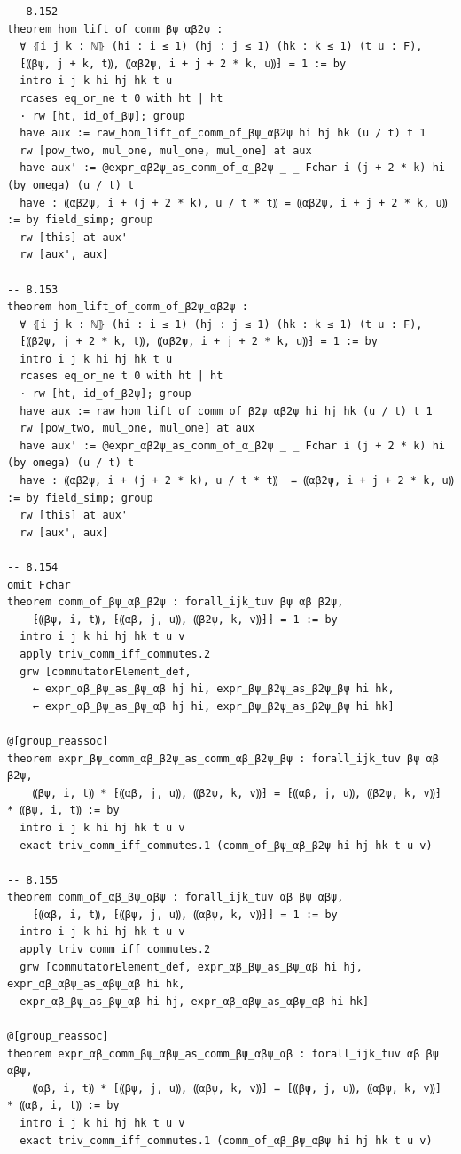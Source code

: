 \begin{Verbatim}
-- 8.152
theorem hom_lift_of_comm_βψ_αβ2ψ :
  ∀ ⦃i j k : ℕ⦄ (hi : i ≤ 1) (hj : j ≤ 1) (hk : k ≤ 1) (t u : F),
  ⁅⸨βψ, j + k, t⸩, ⸨αβ2ψ, i + j + 2 * k, u⸩⁆ = 1 := by
  intro i j k hi hj hk t u
  rcases eq_or_ne t 0 with ht | ht
  · rw [ht, id_of_βψ]; group
  have aux := raw_hom_lift_of_comm_of_βψ_αβ2ψ hi hj hk (u / t) t 1
  rw [pow_two, mul_one, mul_one, mul_one] at aux
  have aux' := @expr_αβ2ψ_as_comm_of_α_β2ψ _ _ Fchar i (j + 2 * k) hi (by omega) (u / t) t
  have : ⸨αβ2ψ, i + (j + 2 * k), u / t * t⸩ = ⸨αβ2ψ, i + j + 2 * k, u⸩ := by field_simp; group
  rw [this] at aux'
  rw [aux', aux]

-- 8.153
theorem hom_lift_of_comm_of_β2ψ_αβ2ψ :
  ∀ ⦃i j k : ℕ⦄ (hi : i ≤ 1) (hj : j ≤ 1) (hk : k ≤ 1) (t u : F),
  ⁅⸨β2ψ, j + 2 * k, t⸩, ⸨αβ2ψ, i + j + 2 * k, u⸩⁆ = 1 := by
  intro i j k hi hj hk t u
  rcases eq_or_ne t 0 with ht | ht
  · rw [ht, id_of_β2ψ]; group
  have aux := raw_hom_lift_of_comm_of_β2ψ_αβ2ψ hi hj hk (u / t) t 1
  rw [pow_two, mul_one, mul_one] at aux
  have aux' := @expr_αβ2ψ_as_comm_of_α_β2ψ _ _ Fchar i (j + 2 * k) hi (by omega) (u / t) t
  have : ⸨αβ2ψ, i + (j + 2 * k), u / t * t⸩  = ⸨αβ2ψ, i + j + 2 * k, u⸩ := by field_simp; group
  rw [this] at aux'
  rw [aux', aux]

-- 8.154
omit Fchar
theorem comm_of_βψ_αβ_β2ψ : forall_ijk_tuv βψ αβ β2ψ,
    ⁅⸨βψ, i, t⸩, ⁅⸨αβ, j, u⸩, ⸨β2ψ, k, v⸩⁆⁆ = 1 := by
  intro i j k hi hj hk t u v
  apply triv_comm_iff_commutes.2
  grw [commutatorElement_def,
    ← expr_αβ_βψ_as_βψ_αβ hj hi, expr_βψ_β2ψ_as_β2ψ_βψ hi hk,
    ← expr_αβ_βψ_as_βψ_αβ hj hi, expr_βψ_β2ψ_as_β2ψ_βψ hi hk]

@[group_reassoc]
theorem expr_βψ_comm_αβ_β2ψ_as_comm_αβ_β2ψ_βψ : forall_ijk_tuv βψ αβ β2ψ,
    ⸨βψ, i, t⸩ * ⁅⸨αβ, j, u⸩, ⸨β2ψ, k, v⸩⁆ = ⁅⸨αβ, j, u⸩, ⸨β2ψ, k, v⸩⁆ * ⸨βψ, i, t⸩ := by
  intro i j k hi hj hk t u v
  exact triv_comm_iff_commutes.1 (comm_of_βψ_αβ_β2ψ hi hj hk t u v)

-- 8.155
theorem comm_of_αβ_βψ_αβψ : forall_ijk_tuv αβ βψ αβψ,
    ⁅⸨αβ, i, t⸩, ⁅⸨βψ, j, u⸩, ⸨αβψ, k, v⸩⁆⁆ = 1 := by
  intro i j k hi hj hk t u v
  apply triv_comm_iff_commutes.2
  grw [commutatorElement_def, expr_αβ_βψ_as_βψ_αβ hi hj, expr_αβ_αβψ_as_αβψ_αβ hi hk,
  expr_αβ_βψ_as_βψ_αβ hi hj, expr_αβ_αβψ_as_αβψ_αβ hi hk]

@[group_reassoc]
theorem expr_αβ_comm_βψ_αβψ_as_comm_βψ_αβψ_αβ : forall_ijk_tuv αβ βψ αβψ,
    ⸨αβ, i, t⸩ * ⁅⸨βψ, j, u⸩, ⸨αβψ, k, v⸩⁆ = ⁅⸨βψ, j, u⸩, ⸨αβψ, k, v⸩⁆ * ⸨αβ, i, t⸩ := by
  intro i j k hi hj hk t u v
  exact triv_comm_iff_commutes.1 (comm_of_αβ_βψ_αβψ hi hj hk t u v)


\end{Verbatim}
